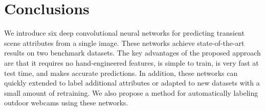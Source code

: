 \documentclass[10pt,twocolumn,letterpaper]{article}
\begin{document}
\section{Conclusions}
\indent
We introduce six deep convolutional neural networks for predicting transient
scene attributes from a single image. These networks achieve state-of-the-art
results on two benchmark datasets. The key advantages of the proposed approach
are that it requires no hand-engineered features, is simple to train, is very
fast at test time, and makes accurate predictions. In addition, these networks
can quickly extended to label additional attributes or adapted to new datasets
with a small amount of retraining.  We also propose a method for automatically
labeling outdoor webcams using these networks.

{\small


}
\end{document}
